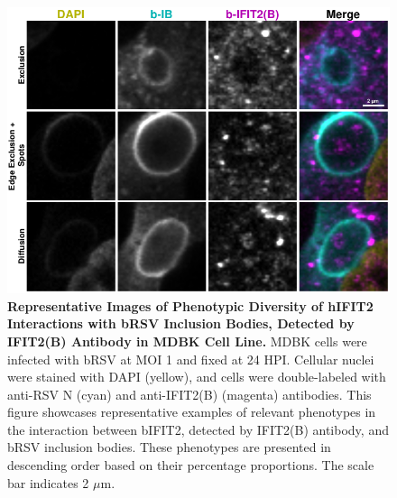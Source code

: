\begin{figure}
    \centering
    \includegraphics[width=1\linewidth]{08. Chapter 3/Figs/02. Infection/02. IFIT2/02. IFIT2B/12. i2b mdbk brsv.pdf} 
    \caption[Representative Images of Phenotypic Diversity of hIFIT2 Interactions with bRSV Inclusion Bodies, Detected by IFIT2(B) Antibody in MDBK Cell Line.]{\textbf{Representative Images of Phenotypic Diversity of hIFIT2 Interactions with bRSV Inclusion Bodies, Detected by IFIT2(B) Antibody in MDBK Cell Line.} MDBK cells were infected with bRSV at MOI 1 and fixed at 24 HPI. Cellular nuclei were stained with DAPI (yellow), and cells were double-labeled with anti-RSV N (cyan) and anti-IFIT2(B) (magenta) antibodies. This figure showcases representative examples of relevant phenotypes in the interaction between bIFIT2, detected by IFIT2(B) antibody, and bRSV inclusion bodies. These phenotypes are presented in descending order based on their percentage proportions. The scale bar indicates 2 \(\mu \mbox{m}\).}
    \label{fig:Representative Images of Phenotypic Diversity of hIFIT2 Interactions with bRSV Inclusion Bodies, Detected by IFIT2(B) Antibody in MDBK Cell Line}
\end{figure}

